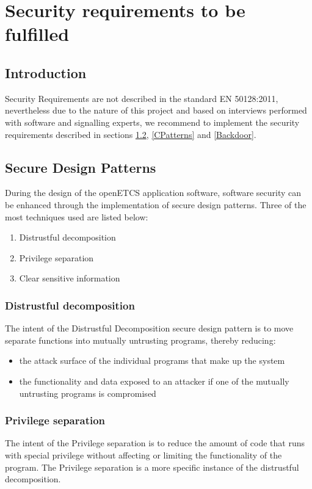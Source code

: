 \documentclass{template/openetcs_report}
\begin{document}
\section{Security requirements to be fulfilled}
\subsection{Introduction}
Security Requirements are not described in the standard EN 50128:2011, nevertheless due to the nature of this project and based on interviews performed with software and signalling experts, we recommend to implement the security requirements described in sections \ref{DPatterns}, \ref{CPatterns} and \ref{Backdoor}.

\subsection{Secure Design Patterns}
\label{DPatterns}
During the design of the openETCS application software, software security can be enhanced through the implementation of secure design patterns. 
Three of the most techniques used are listed below:
\begin{enumerate}
  \item Distrustful decomposition
  \item Privilege separation
  \item Clear sensitive information
\end{enumerate}

\subsubsection{Distrustful decomposition}
The intent of the Distrustful Decomposition secure design pattern is to move separate functions into mutually untrusting programs, thereby reducing:
\begin{itemize}
  \item the attack surface of the individual programs that make up the system
  \item the functionality and data exposed to an attacker if one of the mutually untrusting programs is compromised
\end{itemize}

\subsubsection{Privilege separation}
The intent of the Privilege separation is to reduce the amount of code that runs with special privilege without affecting or limiting the functionality of the program. The Privilege separation is a more specific instance of the distrustful decomposition.
\end{document}
